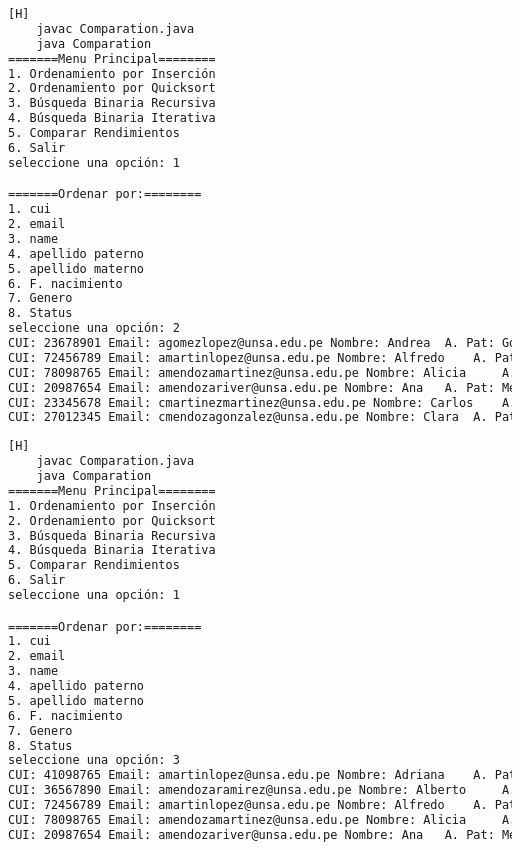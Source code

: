         \begin{lstlisting}[language=bash,caption={Compilación y ejecución del código}][H]
    javac Comparation.java
    java Comparation
=======Menu Principal========
1. Ordenamiento por Inserción
2. Ordenamiento por Quicksort
3. Búsqueda Binaria Recursiva
4. Búsqueda Binaria Iterativa
5. Comparar Rendimientos
6. Salir
seleccione una opción: 1

=======Ordenar por:========
1. cui
2. email
3. name
4. apellido paterno
5. apellido materno
6. F. nacimiento
7. Genero
8. Status
seleccione una opción: 2
CUI: 23678901 Email: agomezlopez@unsa.edu.pe Nombre: Andrea	 A. Pat: Gomez A. Mat: Lopez Fecha de Nacimiento: 1999-04-05 Genero: 0 Estado: 1
CUI: 72456789 Email: amartinlopez@unsa.edu.pe Nombre: Alfredo	 A. Pat: Martin A. Mat: Lopez Fecha de Nacimiento: 1991-08-21 Genero: 0 Estado: 1
CUI: 78098765 Email: amendozamartinez@unsa.edu.pe Nombre: Alicia	 A. Pat: Mendoza A. Mat: Martinez Fecha de Nacimiento: 1991-08-07 Genero: 0 Estado: 1
CUI: 20987654 Email: amendozariver@unsa.edu.pe Nombre: Ana	 A. Pat: Mendoza A. Mat: Rivera Fecha de Nacimiento: 1997-03-25 Genero: 0 Estado: 1
CUI: 23345678 Email: cmartinezmartinez@unsa.edu.pe Nombre: Carlos	 A. Pat: Martinez A. Mat: Martinez Fecha de Nacimiento: 1996-11-25 Genero: 1 Estado: 1
CUI: 27012345 Email: cmendozagonzalez@unsa.edu.pe Nombre: Clara	 A. Pat: Mendoza A. Mat: Gonzalez Fecha de Nacimiento: 1986-12-21 Genero: 0 Estado: 0

  \end{lstlisting}

        \begin{lstlisting}[language=bash,caption={Compilación y ejecución del código}][H]
    javac Comparation.java
    java Comparation
=======Menu Principal========
1. Ordenamiento por Inserción
2. Ordenamiento por Quicksort
3. Búsqueda Binaria Recursiva
4. Búsqueda Binaria Iterativa
5. Comparar Rendimientos
6. Salir
seleccione una opción: 1

=======Ordenar por:========
1. cui
2. email
3. name
4. apellido paterno
5. apellido materno
6. F. nacimiento
7. Genero
8. Status
seleccione una opción: 3
CUI: 41098765 Email: amartinlopez@unsa.edu.pe Nombre: Adriana	 A. Pat: Martin A. Mat: Lopez Fecha de Nacimiento: 1993-03-30 Genero: 0 Estado: 1
CUI: 36567890 Email: amendozaramirez@unsa.edu.pe Nombre: Alberto	 A. Pat: Mendoza A. Mat: Ramirez Fecha de Nacimiento: 1991-05-14 Genero: 0 Estado: 1
CUI: 72456789 Email: amartinlopez@unsa.edu.pe Nombre: Alfredo	 A. Pat: Martin A. Mat: Lopez Fecha de Nacimiento: 1991-08-21 Genero: 0 Estado: 1
CUI: 78098765 Email: amendozamartinez@unsa.edu.pe Nombre: Alicia	 A. Pat: Mendoza A. Mat: Martinez Fecha de Nacimiento: 1991-08-07 Genero: 0 Estado: 1
CUI: 20987654 Email: amendozariver@unsa.edu.pe Nombre: Ana	 A. Pat: Mendoza A. Mat: Rivera Fecha de Nacimiento: 1997-03-25 Genero: 0 Estado: 1

  \end{lstlisting}

